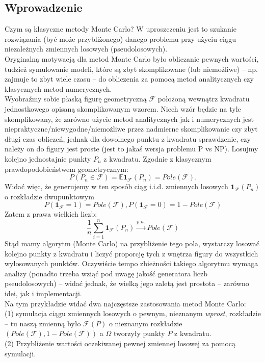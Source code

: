 \documentclass[a4paper]{article}
\theoremstyle{defn}
\theoremstyle{theorem}
\theoremstyle{lemma}
\theoremstyle{cor}
\theoremstyle{fact}
\begin{document}
\subsection{Wprowadzenie}
Czym są klasyczne metody Monte Carlo? W uproszczeniu jest to szukanie rozwiązania (być może przybliżonego) danego problemu przy użyciu ciągu niezależnych zmiennych losowych (pseudolosowych).\\
Oryginalną motywacją dla metod Monte Carlo było obliczanie pewnych wartości, tudzież symulowanie modeli, które są zbyt skomplikowane (lub niemożliwe) – np. zajmuje to zbyt wiele czasu  – do obliczenia za pomocą metod analitycznych czy klasycznych metod numerycznych.
\\

Wyobraźmy sobie płaską figurę geometryczną $\mathcal{F}$ położoną wewnątrz kwadratu jednostkowego opisaną skomplikowanym wzorem.
Niech wzór będzie na tyle skomplikowany, że zarówno użycie metod analitycznych jak i numerycznych jest niepraktyczne/niewygodne/niemożliwe przez nadmierne skomplikowanie czy zbyt długi czas obliczeń, jednak dla dowolnego punktu z kwadratu sprawdzenie, czy należy on do figury jest proste (jest to jakaś wersja problemu P vs NP). Losujmy kolejno jednostajnie punkty $P_n$ z kwadratu. Zgodnie z klasycznym prawdopodobieństwem geometrycznym: $$P(P_n \in \mathcal{F}) = \mathbb{E}\mathbf{1}_{\mathcal{F}}(P_n) = Pole(\mathcal{F}).$$
Widać więc, że generujemy w ten sposób ciąg i.i.d. zmiennych losowych $\mathbf{1}_{\mathcal{F}}(P_n)$ o rozkładzie dwupunktowym $$P(\mathbf{1}_{\mathcal{F}} = 1) = Pole(\mathcal{F}), P(\mathbf{1}_{\mathcal{F}} = 0) = 1 - Pole(\mathcal{F})$$
Zatem z prawa wielkich liczb:
$$\frac{1}{n} \sum\limits_{i=1}^n \mathbf{1}_{\mathcal{F}}(P_n) \overset{p.n.}{\to} Pole(\mathcal{F})$$
Stąd mamy algorytm (Monte Carlo) na przybliżenie tego pola, wystarczy losować kolejno punkty z kwadratu i liczyć proporcję tych z wnętrza figury do wszystkich wylosowanych punktów. Oczywiście tempo zbieżności takiego algorytmu wymaga analizy (ponadto trzeba wziąć pod uwagę jakość generatora liczb pseudolosowych) – widać jednak, że wielką jego zaletą jest prostota – zarówno idei, jak i implementacji.
\\

Na tym przykładzie widać dwa najczęstsze zastosowania metod Monte Carlo:\\
(1) symulacja ciągu zmiennych losowych o pewnym, nieznanym \textit{wprost}, rozkładzie – tu naszą zmienną było $\mathcal{F}(P)$ o nieznanym rozkładzie $(Pole(\mathcal{F}), 1 - Pole(\mathcal{F}))$ a $\Omega$ tworzyły punkty $P$ z kwadratu.\\
(2) Przybliżenie wartości oczekiwanej pewnej zmiennej losowej za pomocą symulacji.
\\
\end{document}
